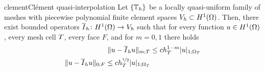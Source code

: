 \begin{Theorem*}{clement}{Clément quasi-interpolation}
  Let $\{\mathbb T_h\}$ be a locally quasi-uniform family of meshes with
  piecewise polynomial finite element spaces
  $V_h\subset H^1(\Omega)$. Then, there exist bounded operators
  $\overline I_h\colon H^1(\Omega) \to V_h$ such that for every
  function $u\in H^1(\Omega)$, every mesh cell $T$, every face
  $F$, and for $m=0,1$ there holds
  \begin{align}
    \lVert u-\overline I_h u\rVert_{m;T} &\le c h_T^{1-m} \lvert u\rvert_{1;\Omega_T} \\
    \lVert u-\overline I_h u\rVert_{0;F} \le c h_T^{\nicefrac{1}{2}} \lvert u\rvert_{1;\Omega_T}
  \end{align}
\end{Theorem*}


